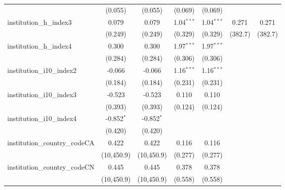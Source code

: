 \begin{tabular}{lcccccc}
                                         & (0.055)        & (0.055)        & (0.069)       & (0.069)       &               &   \\   
   institution\_h\_index3                & 0.079          & 0.079          & 1.04$^{***}$  & 1.04$^{***}$  & 0.271         & 0.271\\   
                                         & (0.249)        & (0.249)        & (0.329)       & (0.329)       & (382.7)       & (382.7)\\   
   institution\_h\_index4                & 0.300          & 0.300          & 1.97$^{***}$  & 1.97$^{***}$  &               &   \\   
                                         & (0.284)        & (0.284)        & (0.306)       & (0.306)       &               &   \\   
   institution\_i10\_index2              & -0.066         & -0.066         & 1.16$^{***}$  & 1.16$^{***}$  &               &   \\   
                                         & (0.184)        & (0.184)        & (0.231)       & (0.231)       &               &   \\   
   institution\_i10\_index3              & -0.523         & -0.523         & 0.110         & 0.110         &               &   \\   
                                         & (0.393)        & (0.393)        & (0.124)       & (0.124)       &               &   \\   
   institution\_i10\_index4              & -0.852$^{*}$   & -0.852$^{*}$   &               &               &               &   \\   
                                         & (0.420)        & (0.420)        &               &               &               &   \\   
   institution\_country\_codeCA          & 0.422          & 0.422          & 0.116         & 0.116         &               &   \\   
                                         & (10,450.9)     & (10,450.9)     & (0.277)       & (0.277)       &               &   \\   
   institution\_country\_codeCN          & 0.445          & 0.445          & 0.378         & 0.378         &               &   \\   
                                         & (10,450.9)     & (10,450.9)     & (0.558)       & (0.558)       &               &   \\   

\end{tabular}
